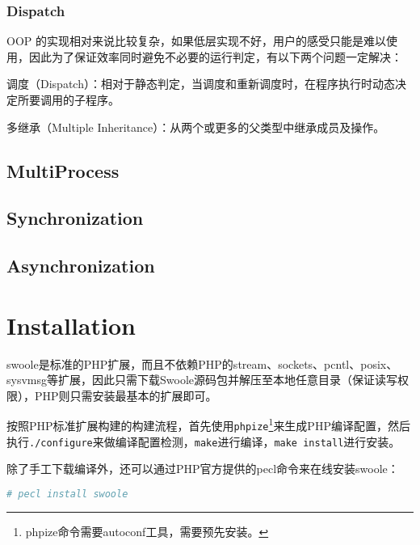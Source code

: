 \subsection{Dispatch}



OOP 的实现相对来说比较复杂，如果低层实现不好，用户的感受只能是难以使用，因此为了保证效率同时避免不必要的运行判定，有以下两个问题一定解决：

\begin{compactitem}
\item 调度（Dispatch）：相对于静态判定，当调度和重新调度时，在程序执行时动态决定所要调用的子程序。
\item 多继承（Multiple Inheritance）：从两个或更多的父类型中继承成员及操作。
\end{compactitem}



\section{MultiProcess}



\section{Synchronization}




\section{Asynchronization}






\chapter{Installation}

swoole是标准的PHP扩展，而且不依赖PHP的stream、sockets、pcntl、posix、sysvmsg等扩展，因此只需下载Swoole源码包并解压至本地任意目录（保证读写权限），PHP则只需安装最基本的扩展即可。

按照PHP标准扩展构建的构建流程，首先使用\texttt{phpize}\footnote{phpize命令需要autoconf工具，需要预先安装。}来生成PHP编译配置，然后执行\texttt{./configure}来做编译配置检测，\texttt{make}进行编译，\texttt{make install}进行安装。

除了手工下载编译外，还可以通过PHP官方提供的pecl命令来在线安装swoole：

\begin{lstlisting}[language=bash]
# pecl install swoole
\end{lstlisting}



